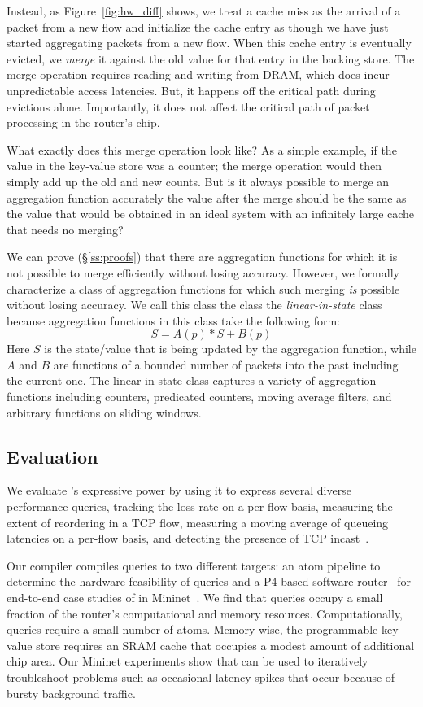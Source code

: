 Instead, as Figure~\ref{fig:hw_diff} shows, we treat a cache miss as the
arrival of a packet from a new flow and initialize the cache entry as though we
have just started aggregating packets from a new flow. When this cache entry is
eventually evicted, we {\em merge} it against the old value for that entry in the
backing store. The merge operation requires reading and writing from DRAM, which does
incur unpredictable access latencies. But, it happens off the critical path
during evictions alone. Importantly, it does not affect the critical path of
packet processing in the router's chip.

What exactly does this merge operation look like? As a simple example, if the
value in the key-value store was a counter; the merge operation would then
simply add up the old and new counts.  But is it always possible to merge an
aggregation function accurately \ie the value after the merge should be the
same as the value that would be obtained in an ideal system with an infinitely
large cache that needs no merging?

We can prove (\S\ref{ss:proofs}) that there are aggregation functions for which
it is not possible to merge efficiently without losing accuracy. However, we
formally characterize a class of aggregation functions for which such merging
{\em is} possible without losing accuracy. We call this class the class the
{\em linear-in-state} class because aggregation functions in this class take
the following form:
\begin{equation}
S = A(p) * S + B(p)
\end{equation}
Here $S$ is the state/value that is being updated by the aggregation function,
while $A$ and $B$ are functions of a bounded number of packets into the past
including the current one. The linear-in-state class captures a variety of
aggregation functions including counters, predicated counters, moving average
filters, and arbitrary functions on sliding windows.

\subsection{Evaluation} We evaluate \TheSystem's expressive power by using it
to express several diverse performance queries, \eg tracking the loss rate on a
per-flow basis, measuring the extent of reordering in a TCP flow, measuring a
moving average of queueing latencies on a per-flow basis, and detecting the
presence of TCP incast~\cite{tcpincast}.

Our \TheSystem compiler compiles queries to two different targets: an atom
pipeline to determine the hardware feasibility of \TheSystem queries and a
P4-based software router~\cite{p4-bmv2} for end-to-end case studies of
\TheSystem in Mininet~\cite{mininet}. We find that \TheSystem queries occupy a
small fraction of the router's computational and memory resources.
Computationally, queries require a small number of atoms. Memory-wise, the
programmable key-value store requires an SRAM cache that occupies a modest
amount of additional chip area. Our Mininet experiments show that \TheSystem
can be used to iteratively troubleshoot problems such as occasional latency
spikes that occur because of bursty background traffic.


